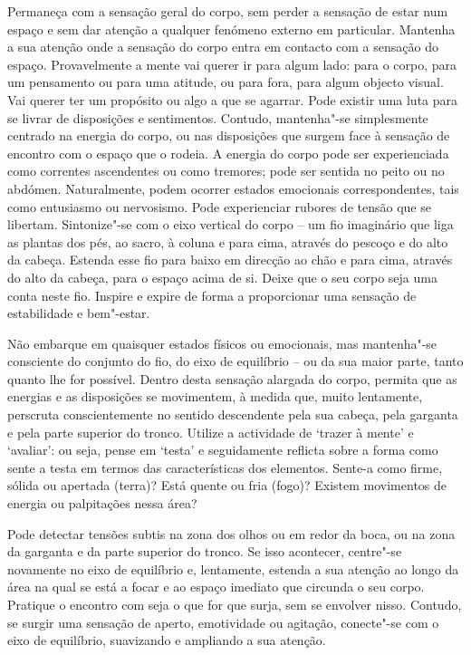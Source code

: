 Permaneça com a sensação geral do corpo, sem perder a sensação de estar num
espaço e sem dar atenção a qualquer fenómeno externo em particular. Mantenha a
sua atenção onde a sensação do corpo entra em contacto com a sensação do espaço.
Provavelmente a mente vai querer ir para algum lado: para o corpo, para um
pensamento ou para uma atitude, ou para fora, para algum objecto visual. Vai
querer ter um propósito ou algo a que se agarrar. Pode existir uma luta para se
livrar de disposições e sentimentos. Contudo, mantenha"-se simplesmente centrado
na energia do corpo, ou nas disposições que surgem face à sensação de encontro
com o espaço que o rodeia. A energia do corpo pode ser experienciada como
correntes ascendentes ou como tremores; pode ser sentida no peito ou no abdómen.
Naturalmente, podem ocorrer estados emocionais correspondentes, tais como
entusiasmo ou nervosismo. Pode experienciar rubores de tensão que se libertam.
Sintonize"-se com o eixo vertical do corpo -- um fio imaginário que liga as
plantas dos pés, ao sacro, à coluna e para cima, através do pescoço e do alto da
cabeça. Estenda esse fio para baixo em direcção ao chão e para cima, através do
alto da cabeça, para o espaço acima de si. Deixe que o seu corpo seja uma conta
neste fio. Inspire e expire de forma a proporcionar uma sensação de estabilidade
e bem"-estar.

Não embarque em quaisquer estados físicos ou emocionais, mas mantenha"-se
consciente do conjunto do fio, do eixo de equilíbrio -- ou da sua maior parte,
tanto quanto lhe for possível. Dentro desta sensação alargada do corpo, permita
que as energias e as disposições se movimentem, à medida que, muito lentamente,
perscruta conscientemente no sentido descendente pela sua cabeça, pela garganta
e pela parte superior do tronco. Utilize a actividade de `trazer à mente' e
`avaliar': ou seja, pense em `testa' e seguidamente reflicta sobre a forma como
sente a testa em termos das características dos elementos. Sente-a como firme,
sólida ou apertada (terra)? Está quente ou fria (fogo)? Existem movimentos de
energia ou palpitações nessa área?

Pode detectar tensões subtis na zona dos olhos ou em redor da boca, ou na zona
da garganta e da parte superior do tronco. Se isso acontecer, centre"-se
novamente no eixo de equilíbrio e, lentamente, estenda a sua atenção ao longo da
área na qual se está a focar e ao espaço imediato que circunda o seu corpo.
Pratique o encontro com seja o que for que surja, sem se envolver nisso.
Contudo, se surgir uma sensação de aperto, emotividade ou agitação, conecte"-se
com o eixo de equilíbrio, suavizando e ampliando a sua atenção.

